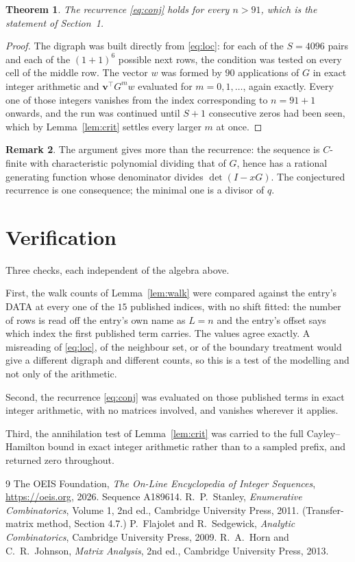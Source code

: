 \documentclass[11pt,a4paper]{article}
\theoremstyle{plain}
\newtheorem{theorem}{Theorem}
\theoremstyle{definition}
\newtheorem{remark}[theorem]{Remark}
\begin{document}
\begin{theorem}
The recurrence \eqref{eq:conj} holds for every $n>91$, which is the statement of
Section~1.
\end{theorem}

\begin{proof}
The digraph was built directly from \eqref{eq:loc}: for each of the $S=4096$ pairs and each
of the $(1+1)^{6}$ possible next rows, the condition was tested on every cell of
the middle row. The vector $w$ was formed by $90$ applications of $G$ in exact integer
arithmetic and $\mathbf{v}^{\!\top}G^{m}w$ evaluated for $m=0,1,\dots$, again exactly.
Every one of those integers vanishes from the index corresponding to $n=91+1$ onwards,
and the run was continued until $S+1$ consecutive zeros had been seen, which by
Lemma~\ref{lem:crit} settles every larger $m$ at once.
\end{proof}

\begin{remark}
The argument gives more than the recurrence: the sequence is $C$-finite with characteristic
polynomial dividing that of $G$, hence has a rational generating function whose denominator
divides $\det(I-xG)$. The conjectured recurrence is one consequence; the minimal one is a
divisor of $q$.
\end{remark}

\section{Verification}

Three checks, each independent of the algebra above.

First, the walk counts of Lemma~\ref{lem:walk} were compared against the entry's DATA at
every one of the $15$ published indices, with no shift fitted: the number of rows is
read off the entry's own name as $L=n$ and the entry's offset says which index the first
published term carries. The values agree exactly. A misreading of \eqref{eq:loc}, of the
neighbour set, or of the boundary treatment would give a different digraph and different
counts, so this is a test of the modelling and not only of the arithmetic.

Second, the recurrence \eqref{eq:conj} was evaluated on those published terms in exact
integer arithmetic, with no matrices involved, and vanishes wherever it applies.

Third, the annihilation test of Lemma~\ref{lem:crit} was carried to the full
Cayley--Hamilton bound in exact integer arithmetic rather than to a sampled prefix, and
returned zero throughout.

\begin{thebibliography}{9}
 The OEIS Foundation, \emph{The On-Line Encyclopedia of Integer
Sequences}, \url{https://oeis.org}, 2026. Sequence A189614.
 R.~P.~Stanley, \emph{Enumerative Combinatorics}, Volume 1, 2nd ed.,
Cambridge University Press, 2011. (Transfer-matrix method, Section 4.7.)
 P.~Flajolet and R.~Sedgewick, \emph{Analytic Combinatorics}, Cambridge
University Press, 2009.
 R.~A.~Horn and C.~R.~Johnson, \emph{Matrix Analysis}, 2nd ed., Cambridge
University Press, 2013.
\end{thebibliography}
\end{document}
